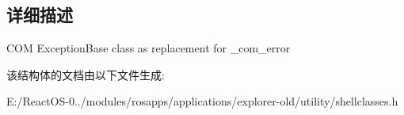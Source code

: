 \subsection{详细描述}
C\+OM Exception\+Base class as replacement for \+\_\+com\+\_\+error 

该结构体的文档由以下文件生成\+:\begin{DoxyCompactItemize}
\item 
E\+:/\+React\+O\+S-\/0../modules/rosapps/applications/explorer-\/old/utility/shellclasses.\+h\end{DoxyCompactItemize}
